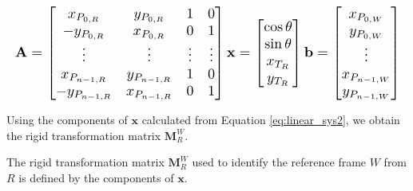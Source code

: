 \documentclass[letterpaper, 10 pt, conference]{ieeeconf}  %
\begin{document}
\begin{equation}\label{eq:linear_sys2}
\resizebox{\columnwidth}{!}{$%
	\begin{gathered}
	\mathbf{A} =   \begin{bmatrix}
	x_{P_{0,R}} & y_{P_{0,R}} & 1 & 0\\
	-y_{P_{0,R}} & x_{P_{0,R}} & 0 & 1 \\
	\vdots & \vdots & \vdots & \vdots\\
	x_{P_{n-1,R}} & y_{P_{n-1,R}} & 1 & 0\\
	-y_{P_{n-1,R}} & x_{P_{n-1,R}} & 0 & 1 
	\end{bmatrix}
	\mathbf{x} =   \begin{bmatrix}
	\cos\theta\\
	\sin\theta\\
	x_{T_R}\\
	y_{T_R}
	\end{bmatrix}
	\mathbf{b} =   \begin{bmatrix}
	x_{P_{0,W}}\\
	y_{P_{0,W}}\\
	\vdots\\
	x_{P_{n-1,W}}\\
	y_{P_{n-1,W}}\\
	\end{bmatrix}
	\end{gathered}
	$%
}%
\end{equation}

Using the components of $\mathbf{x}$ calculated from Equation \ref{eq:linear_sys2}, we obtain the rigid transformation matrix $\mathbf{M}^W_{R}$.

The rigid transformation matrix $\mathbf{M}^W_{R}$ used to identify the reference frame $W$ from $R$ is defined by the components of $\mathbf{x}$.
\end{document}
